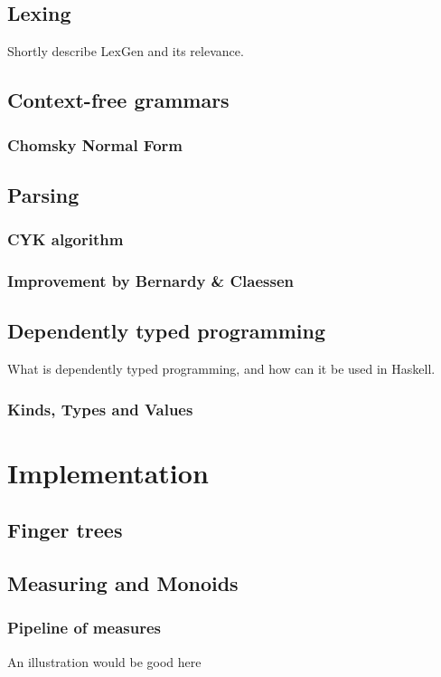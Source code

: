 \documentclass[a4paper,12pt,twosided]{report}
\begin{document}
\section{Lexing}
Shortly describe LexGen and its relevance.

\section{Context-free grammars}
\subsection{Chomsky Normal Form}

\section{Parsing}
\subsection{CYK algorithm}
\subsection{Improvement by Bernardy \& Claessen}

\section{Dependently typed programming}
What is dependently typed programming, and how can it be used in Haskell.
\subsection{Kinds, Types and Values}

%
%

\chapter{Implementation}

\section{Finger trees}
\section{Measuring and Monoids}
\subsection{Pipeline of measures}
An illustration would be good here
\end{document}
